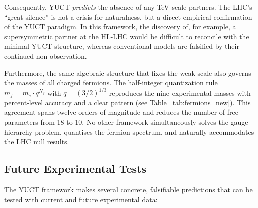 \documentclass[11pt,a4paper]{article}
\begin{document}
	Consequently, YUCT \emph{predicts} the absence of any TeV-scale partners. The LHC's ``great silence'' is not a crisis for naturalness, but a direct empirical confirmation of the YUCT paradigm. In this framework, the discovery of, for example, a supersymmetric partner at the HL-LHC would be difficult to reconcile with the minimal YUCT structure, whereas conventional models are falsified by their continued non-observation.
	
	Furthermore, the same algebraic structure that fixes the weak scale also governs the masses of all charged fermions. The half-integer quantization rule $m_f = m_e \cdot q^{N_f}$ with $q = (3/2)^{1/3}$ reproduces the nine experimental masses with percent-level accuracy and a clear pattern (see Table~\ref{tab:fermions_new}). This agreement spans twelve orders of magnitude and reduces the number of free parameters from 18 to 10. No other framework simultaneously solves the gauge hierarchy problem, quantises the fermion spectrum, and naturally accommodates the LHC null results.
	
	\subsection{Future Experimental Tests}
	
	The YUCT framework makes several concrete, falsifiable predictions that can be tested with current and future experimental data:
	
\end{document}
